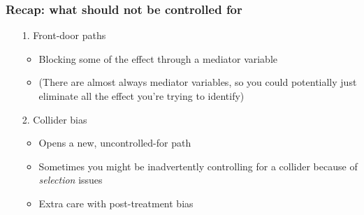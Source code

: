 \documentclass[aspectratio=43]{beamer}
\begin{document}
\begin{frame}
\frametitle{Recap: what should not be controlled for}
\centering

\begin{itemize}
  \item[1.] Front-door paths
  \begin{itemize}
    \item Blocking some of the effect through a mediator variable
    \item (There are almost always mediator variables, so you could potentially just eliminate all the effect you're trying to identify)
  \end{itemize}
  \item[]
  \item[2.] Collider bias
  \begin{itemize}
    \item Opens a new, uncontrolled-for path
    \item Sometimes you might be inadvertently controlling for a collider because of \textit{selection} issues
    \item Extra care with post-treatment bias
  \end{itemize}
\end{itemize}

\end{frame}



\end{document}

